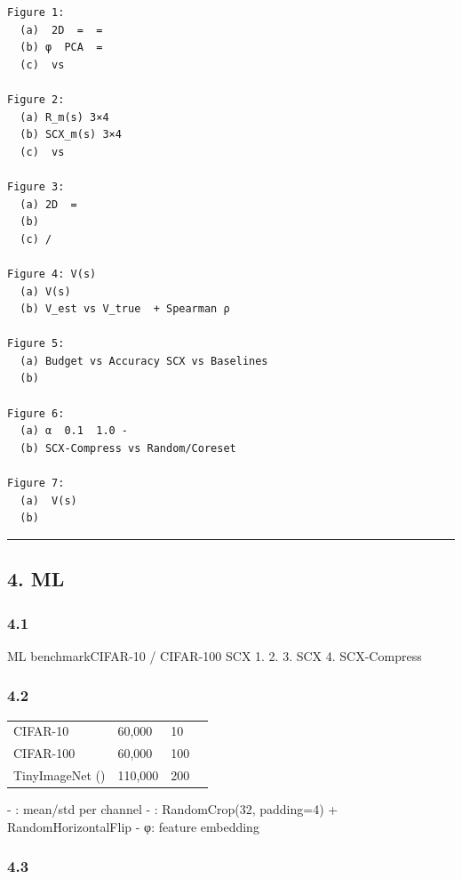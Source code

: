 \documentclass[
  12pt,
]{article}
\begin{document}
\begin{verbatim}
Figure 1: 
  (a)  2D  =  = 
  (b) φ  PCA  = 
  (c)  vs 

Figure 2: 
  (a) R_m(s) 3×4
  (b) SCX_m(s) 3×4
  (c)  vs 

Figure 3: 
  (a) 2D  = 
  (b) 
  (c) /

Figure 4: V(s) 
  (a) V(s) 
  (b) V_est vs V_true  + Spearman ρ

Figure 5: 
  (a) Budget vs Accuracy SCX vs Baselines
  (b) 

Figure 6: 
  (a) α  0.1  1.0 -
  (b) SCX-Compress vs Random/Coreset 

Figure 7: 
  (a)  V(s) 
  (b) 
\end{verbatim}

\begin{center}\rule{0.5\linewidth}{0.5pt}\end{center}

\subsection{4.  ML
}\label{ux901aux7528-ml-ux5b9eux9a8cux8bbeux8ba1ux65b9ux6848}

\subsubsection{4.1 }\label{ux5b9eux9a8cux76eeux6807-1}

 ML benchmarkCIFAR-10 / CIFAR-100 SCX  1.
 2.
 3. SCX
 4. SCX-Compress


\subsubsection{4.2 }\label{ux6570ux636eux96c6}

\begin{longtable}[]{@{}llll@{}}
\toprule\noalign{}
 &  &  &  \\
\midrule\noalign{}
\endhead
\bottomrule\noalign{}
\endlastfoot
CIFAR-10 & 60,000 & 10 &  \\
CIFAR-100 & 60,000 & 100 &  \\
TinyImageNet () & 110,000 & 200 &  \\
\end{longtable}

 - : mean/std per channel - : RandomCrop(32,
padding=4) + RandomHorizontalFlip -  φ:
feature embedding

\subsubsection{4.3
}\label{ux591aux4e13ux5bb6ux573aux666fux6784ux9020}
\end{document}
